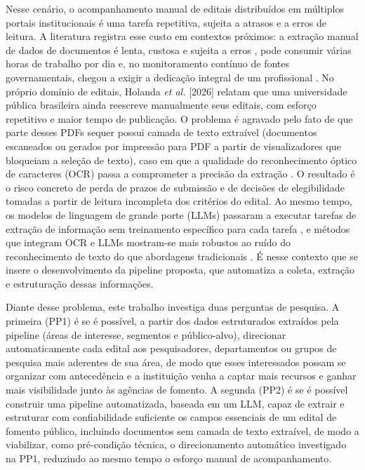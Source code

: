 \documentclass[12pt]{article}
\begin{document}
  Nesse cenário, o acompanhamento manual de editais distribuídos em múltiplos portais institucionais é uma tarefa repetitiva, sujeita a atrasos e a erros de leitura. A literatura registra esse custo em contextos próximos: a extração manual de dados de documentos é lenta, custosa e sujeita a erros \cite{b4}, pode consumir várias horas de trabalho por dia \cite{b6} e, no monitoramento contínuo de fontes governamentais, chegou a exigir a dedicação integral de um profissional \cite{b3}. No próprio domínio de editais, Holanda \emph{et al.} [2026] relatam que uma universidade pública brasileira ainda reescreve manualmente seus editais, com esforço repetitivo e maior tempo de publicação. O problema é agravado pelo fato de que parte desses PDFs sequer possui camada de texto extraível (documentos escaneados ou gerados por impressão para PDF a partir de visualizadores que bloqueiam a seleção de texto), caso em que a qualidade do reconhecimento óptico de caracteres (OCR) passa a comprometer a precisão da extração \cite{b9}. O resultado é o risco concreto de perda de prazos de submissão e de decisões de elegibilidade tomadas a partir de leitura incompleta dos critérios do edital. Ao mesmo tempo, os modelos de linguagem de grande porte (LLMs) passaram a executar tarefas de extração de informação sem treinamento específico para cada tarefa \cite{b4,b7}, e métodos que integram OCR e LLMs mostram-se mais robustos ao ruído do reconhecimento de texto do que abordagens tradicionais \cite{b6}. É nesse contexto que se insere o desenvolvimento da pipeline proposta, que automatiza a coleta, extração e estruturação dessas informações.

  Diante desse problema, este trabalho investiga duas perguntas de pesquisa. A primeira (PP1) é se é possível, a partir dos dados estruturados extraídos pela pipeline (áreas de interesse, segmentos e público-alvo), direcionar automaticamente cada edital aos pesquisadores, departamentos ou grupos de pesquisa mais aderentes de sua área, de modo que esses interessados possam se organizar com antecedência e a instituição venha a captar mais recursos e ganhar mais visibilidade junto às agências de fomento. A segunda (PP2) é se é possível construir uma pipeline automatizada, baseada em um LLM, capaz de extrair e estruturar com confiabilidade suficiente os campos essenciais de um edital de fomento público, incluindo documentos sem camada de texto extraível, de modo a viabilizar, como pré-condição técnica, o direcionamento automático investigado na PP1, reduzindo ao mesmo tempo o esforço manual de acompanhamento.
\end{document}
